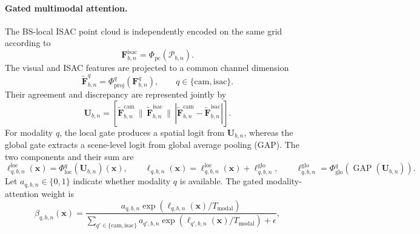 \paragraph{Gated multimodal attention.}
The BS-local ISAC point cloud is independently encoded on the same grid according to
\begin{equation}
    \mathbf{F}^{\mathrm{isac}}_{b,n}
    =
    \Phi_{\mathrm{pc}}\!
    \left(\mathcal{P}_{b,n}\right).
    \label{eq:method-isac-encoding}
\end{equation}
The visual and ISAC features are projected to a common channel dimension
\begin{equation}
    \widetilde{\mathbf{F}}^{q}_{b,n}
    =\Phi^{q}_{\mathrm{proj}}\!\left(\mathbf{F}^{q}_{b,n}\right),
    \qquad q\in\{\mathrm{cam},\mathrm{isac}\}.
    \label{eq:method-modal-projection}
\end{equation}
Their agreement and discrepancy are represented jointly by
\begin{equation}
    \mathbf{U}_{b,n}
    =
    \left[
    \widetilde{\mathbf{F}}^{\mathrm{cam}}_{b,n}
    \,\|\,
    \widetilde{\mathbf{F}}^{\mathrm{isac}}_{b,n}
    \,\|\,
    \left|
    \widetilde{\mathbf{F}}^{\mathrm{cam}}_{b,n}
    -\widetilde{\mathbf{F}}^{\mathrm{isac}}_{b,n}
    \right|
    \right].
    \label{eq:method-modal-interaction}
\end{equation}
For modality \(q\), the local gate produces a spatial logit from
\(\mathbf{U}_{b,n}\), whereas the global gate extracts a scene-level logit from
global average pooling (GAP).  The two components and their sum are
\begin{equation}
    \ell^{\mathrm{loc}}_{q,b,n}(\mathbf{x})
    =
    \Phi^{q}_{\mathrm{loc}}\!\left(\mathbf{U}_{b,n}\right)(\mathbf{x}),
    \qquad
    \ell_{q,b,n}(\mathbf{x})
    =
    \ell^{\mathrm{loc}}_{q,b,n}(\mathbf{x})
    +\ell^{\mathrm{glo}}_{q,b,n},
    \qquad
    \ell^{\mathrm{glo}}_{q,b,n}
    =
    \Phi^{q}_{\mathrm{glo}}\!\left(
    \operatorname{GAP}(\mathbf{U}_{b,n})\right).
    \label{eq:method-modal-logit}
\end{equation}
Let \(a_{q,b,n}\in\{0,1\}\) indicate whether modality \(q\) is available.  The
gated modality-attention weight is
\begin{equation}
    \beta_{q,b,n}(\mathbf{x})
    =
    \frac{
    a_{q,b,n}
    \exp\!\left(\ell_{q,b,n}(\mathbf{x})/T_{\mathrm{modal}}\right)}
    {\sum_{q'\in\{\mathrm{cam},\mathrm{isac}\}}
    a_{q',b,n}
    \exp\!\left(\ell_{q',b,n}(\mathbf{x})/T_{\mathrm{modal}}\right)+\epsilon},
    \label{eq:method-modal-attention}
\end{equation}
